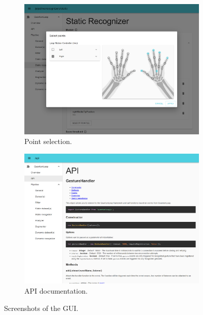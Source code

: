 \begin{figure}[!b]
    \vspace{2pt}
    \begin{subfigure}{.49\textwidth}
        \centering
        \includegraphics[width=\linewidth]{Figures/QuantumLeap/UI/module-point_selection.pdf}  
        \vspace{-15pt}
        \captionsetup{width=.9\linewidth}
        \caption{Point selection.}
        \label{fig:quantumleap:ui:4}
    \end{subfigure}
    \begin{subfigure}{.49\textwidth}
        \centering
        \includegraphics[width=\linewidth]{Figures/QuantumLeap/UI/api.pdf}  
        \vspace{-15pt}
        \captionsetup{width=.9\linewidth}
        \caption{API documentation.}
        \label{fig:quantumleap:ui:2}
    \end{subfigure}

    \caption{Screenshots of the \ql GUI.}
    \label{fig:quantumleap:ui}
\end{figure}

